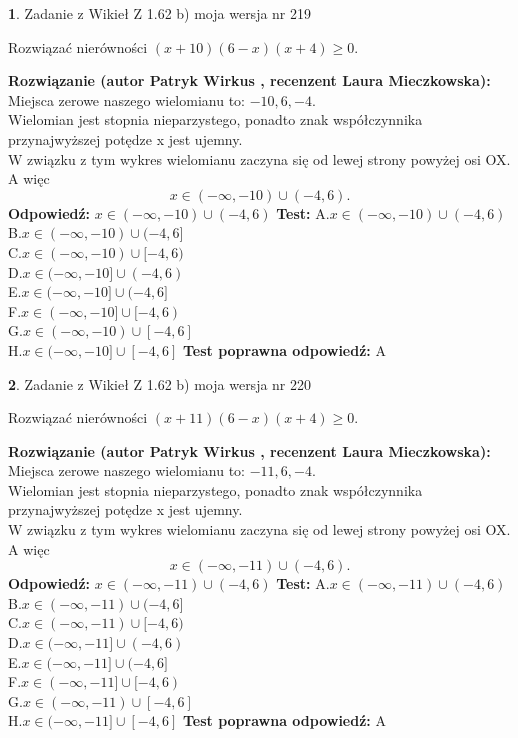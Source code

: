 \documentclass[12pt, a4paper]{article}
\theoremstyle{definition} %
\newtheorem{zad}{}
\newcommand{\zadStart}[1]{\begin{zad}#1\newline}
\newcommand{\zadStop}{\end{zad}}
\newcommand{\rozwStart}[2]{\noindent \textbf{Rozwiązanie (autor #1 , recenzent #2): }\newline}
\newcommand{\rozwStop}{\newline}
\newcommand{\odpStart}{\noindent \textbf{Odpowiedź:}\newline}
\newcommand{\odpStop}{\newline}
\newcommand{\testStart}{\noindent \textbf{Test:}\newline}
\newcommand{\testStop}{\newline}
\newcommand{\kluczStart}{\noindent \textbf{Test poprawna odpowiedź:}\newline}
\newcommand{\kluczStop}{\newline}
\begin{document}
\zadStart{Zadanie z Wikieł Z 1.62 b) moja wersja nr 219}

Rozwiązać nierówności $(x+10)(6-x)(x+4)\ge0$.
\zadStop
\rozwStart{Patryk Wirkus}{Laura Mieczkowska}
Miejsca zerowe naszego wielomianu to: $-10, 6, -4$.\\
Wielomian jest stopnia nieparzystego, ponadto znak współczynnika przy\linebreak najwyższej potędze x jest ujemny.\\ W związku z tym wykres wielomianu zaczyna się od lewej strony powyżej osi OX. A więc $$x \in (-\infty,-10) \cup (-4,6).$$
\rozwStop
\odpStart
$x \in (-\infty,-10) \cup (-4,6)$
\odpStop
\testStart
A.$x \in (-\infty,-10) \cup (-4,6)$\\
B.$x \in (-\infty,-10) \cup (-4,6]$\\
C.$x \in (-\infty,-10) \cup [-4,6)$\\
D.$x \in (-\infty,-10] \cup (-4,6)$\\
E.$x \in (-\infty,-10] \cup (-4,6]$\\
F.$x \in (-\infty,-10] \cup [-4,6)$\\
G.$x \in (-\infty,-10) \cup [-4,6]$\\
H.$x \in (-\infty,-10] \cup [-4,6]$
\testStop
\kluczStart
A
\kluczStop



\zadStart{Zadanie z Wikieł Z 1.62 b) moja wersja nr 220}

Rozwiązać nierówności $(x+11)(6-x)(x+4)\ge0$.
\zadStop
\rozwStart{Patryk Wirkus}{Laura Mieczkowska}
Miejsca zerowe naszego wielomianu to: $-11, 6, -4$.\\
Wielomian jest stopnia nieparzystego, ponadto znak współczynnika przy\linebreak najwyższej potędze x jest ujemny.\\ W związku z tym wykres wielomianu zaczyna się od lewej strony powyżej osi OX. A więc $$x \in (-\infty,-11) \cup (-4,6).$$
\rozwStop
\odpStart
$x \in (-\infty,-11) \cup (-4,6)$
\odpStop
\testStart
A.$x \in (-\infty,-11) \cup (-4,6)$\\
B.$x \in (-\infty,-11) \cup (-4,6]$\\
C.$x \in (-\infty,-11) \cup [-4,6)$\\
D.$x \in (-\infty,-11] \cup (-4,6)$\\
E.$x \in (-\infty,-11] \cup (-4,6]$\\
F.$x \in (-\infty,-11] \cup [-4,6)$\\
G.$x \in (-\infty,-11) \cup [-4,6]$\\
H.$x \in (-\infty,-11] \cup [-4,6]$
\testStop
\kluczStart
A
\kluczStop
\end{document}
